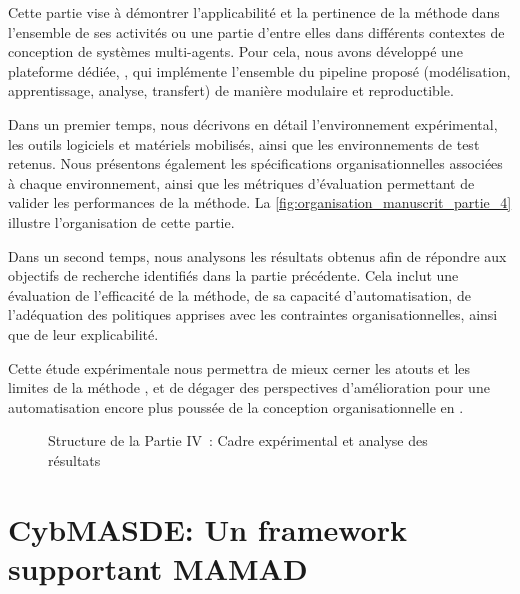 \noindent
Cette partie vise à démontrer l'applicabilité et la pertinence de la méthode  dans l'ensemble de ses activités ou une partie d'entre elles dans différents contextes de conception de systèmes multi-agents. Pour cela, nous avons développé une plateforme dédiée, , qui implémente l'ensemble du pipeline proposé (modélisation, apprentissage, analyse, transfert) de manière modulaire et reproductible.

\medskip

\noindent
Dans un premier temps, nous décrivons en détail l'environnement expérimental, les outils logiciels et matériels mobilisés, ainsi que les environnements de test retenus. Nous présentons également les spécifications organisationnelles associées à chaque environnement, ainsi que les métriques d'évaluation permettant de valider les performances de la méthode. La \autoref{fig:organisation_manuscrit_partie_4} illustre l'organisation de cette partie.

\medskip

\noindent
Dans un second temps, nous analysons les résultats obtenus afin de répondre aux objectifs de recherche identifiés dans la partie précédente. Cela inclut une évaluation de l'efficacité de la méthode, de sa capacité d'automatisation, de l'adéquation des politiques apprises avec les contraintes organisationnelles, ainsi que de leur explicabilité.

\medskip

\noindent
Cette étude expérimentale nous permettra de mieux cerner les atouts et les limites de la méthode , et de dégager des perspectives d'amélioration pour une automatisation encore plus poussée de la conception organisationnelle en .



\begin{figure}[h!]
  \centering
  \resizebox{0.8\linewidth}{!}{%
    
  }
  \caption{Structure de la Partie IV~: Cadre expérimental et analyse des résultats}
  \label{fig:organisation_manuscrit_partie_4}
\end{figure}

\clearpage
\thispagestyle{empty}
\null
\newpage

\chapter{CybMASDE: Un framework supportant MAMAD}
\label{sec:cybmasde}

